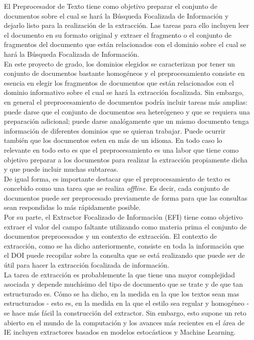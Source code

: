 El Preprocesador de Texto tiene como objetivo preparar el conjunto de documentos sobre el cual se hará la Búsqueda Focalizada de Información y dejarlo listo para la realización de la extracción. Las tareas para ello incluyen leer el documento en su formato original y extraer el fragmento o el conjunto de fragmentos del documento que están relacionados con el dominio sobre el cual se hará la Búsqueda Focalizada de Información. \\

En este proyecto de grado, los dominios elegidos se caracterizan por tener un conjunto de documentos bastante homogéneos y el preprocesamiento consiste en esencia en elegir los fragmentos de documentos que están relacionados con el dominio informativo sobre el cual se hará la extracción focalizada. Sin embargo, en general el preprocesamiento de documentos podría incluir tareas más amplias: puede darse que el conjunto de documentos sea heterógeneo y que se requiera una preparación adicional; puede darse analógamente que un mismo documento tenga información de diferentes dominios que se quieran trabajar. Puede ocurrir también que los documentos esten en más de un idioma. En todo caso lo relevante en todo esto es que el preprocesamiento es una labor que tiene como objetivo preparar a los documentos para realizar la extracción propiamente dicha y que puede incluir muchas subtareas.   \\

De igual forma, es importante destacar que el preprocesamiento de texto es concebido como una tarea que se realiza \emph{offline}. Es decir, cada conjunto de documentos puede ser preprocesado previamente de forma para que las consultas sean respondidas lo más rápidamente posible. \\

Por su parte, el Extractor Focalizado de Información (EFI) tiene como objetivo extraer el valor del campo faltante utilizando como materia prima el conjunto de documentos preprocesados y un contexto de extracción. El contexto de extracción, como se ha dicho anteriormente, consiste en toda la información que el DOI puede recopilar sobre la consulta que se está realizando que puede ser de útil para hacer la extracción focalizada de información. \\

La tarea de extracción es probablemente la que tiene una mayor complejidad asociada y depende muchísimo del tipo de documento que se trate y de que tan estructurado es. Cómo se ha dicho, en la medida en la que los textos sean mas estructurados - esto es, en la medida en la que el estilo sea regular y homogéneo - se hace más fácil la construcción del extractor. Sin embargo, esto supone un reto abierto en el mundo de la computación y los avances más recientes en el área de IE incluyen extractores basados en modelos estocásticos y Machine Learning. \\

